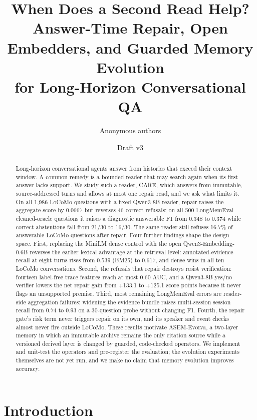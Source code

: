 \documentclass[11pt]{article}
\title{When Does a Second Read Help?\\
Answer-Time Repair, Open Embedders, and Guarded Memory Evolution\\
for Long-Horizon Conversational QA}
\author{Anonymous authors}
\date{Draft v3}
\newcommand{\care}{\textsc{CARE}}
\newcommand{\evolve}{\textsc{ASEM-Evolve}}
\begin{document}
\maketitle

\begin{abstract}
Long-horizon conversational agents answer from histories that exceed their
context window. A common remedy is a bounded reader that may search again when
its first answer lacks support. We study such a reader, \care{}, which answers
from immutable, source-addressed turns and allows at most one repair read, and
we ask what limits it. On all 1,986 LoCoMo questions with a fixed Qwen3-8B
reader, repair raises the aggregate score by 0.0667 but reverses 46 correct
refusals; on all 500 LongMemEval cleaned-oracle questions it raises a diagnostic
answerable F1 from 0.348 to 0.374 while correct abstentions fall from 21/30 to
16/30. The same reader still refuses 16.7\% of answerable LoCoMo questions after
repair. Four further findings shape the design space. First, replacing the
MiniLM dense control with the open Qwen3-Embedding-0.6B reverses the earlier
lexical advantage at the retrieval level: annotated-evidence recall at eight
turns rises from 0.539 (BM25) to 0.617, and dense wins in all ten LoCoMo
conversations. Second, the refusals that repair destroys resist verification:
fourteen label-free trace features reach at most 0.60 AUC, and a Qwen3-8B yes/no
verifier lowers the net repair gain from +133.1 to +125.1 score points because
it never flags an unsupported premise. Third, most remaining LongMemEval errors
are reader-side aggregation failures: widening the evidence bundle raises
multi-session session recall from 0.74 to 0.93 on a 30-question probe without
changing F1. Fourth, the repair gate's risk term never triggers repair on its own,
and its speaker and event checks almost never fire outside LoCoMo. These results
motivate \evolve{}, a two-layer memory in which an immutable archive remains the
only citation source while a versioned derived layer is changed by guarded,
code-checked operators. We implement and unit-test the operators and
pre-register the evaluation; the evolution experiments themselves are not yet
run, and we make no claim that memory evolution improves accuracy.
\end{abstract}

\section{Introduction}
\label{sec:intro}
\end{document}
